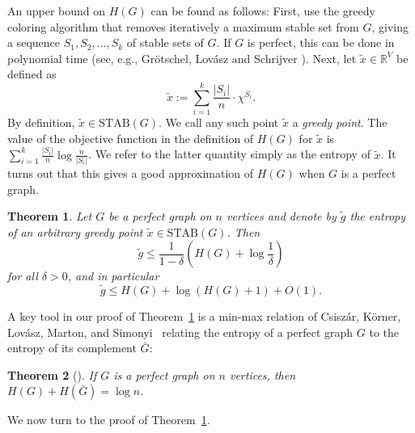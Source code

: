 \documentclass[12pt,oneside]{article}
\newtheorem{theorem}{Theorem}
\newcommand{\STAB}{\mathrm{STAB}}
\begin{document}
An upper bound on $H(G)$ can be found as follows: First, use the greedy coloring algorithm that removes iteratively a maximum stable set from $G$, giving a sequence $S_{1}, S_{2}, \dots, S_{k}$ of stable sets of $G$. If $G$ is perfect, this can be done in polynomial time (see, e.g., Gr\"otschel, Lov\'asz and Schrijver \cite{GLS93}). Next, let $\tilde x \in \mathbb{R}^V$ be defined as
$$
\tilde x := \sum_{i=1}^k \frac{|S_{i}|}{n} \cdot \chi^{S_{i}}.
$$
By definition, $\tilde x \in \STAB(G)$. We call any such point $\tilde{x}$ a {\em greedy point}. The value of the objective function in the definition of $H(G)$ for $\tilde x$ is $\sum_{i=1}^k \frac{|S_{i}|}{n} \log \frac{n}{|S_{i}|}$. We refer to the latter quantity simply as the entropy of $\tilde x$.
It turns out that this gives a good approximation of $H(G)$ when $G$ is a perfect graph.

\begin{theorem}
\label{th-greedy-perfect-graphs}
Let $G$ be a perfect graph on $n$ vertices and denote
by $\tilde{g}$ the entropy of an arbitrary greedy point $\tilde{x} \in \STAB(G)$. Then
$$
\tilde{g} \leq \frac{1}{1-\delta} \left(H(G) + \log \frac{1}{\delta} \right)
$$
for all $\delta > 0$, and in particular
$$
\tilde{g} \leq H(G) + \log (H(G)+1) + O(1).
$$
\end{theorem}

A key tool in our proof of Theorem~\ref{th-greedy-perfect-graphs} is a min-max relation of Csisz{\'a}r, K{\"o}rner, Lov{\'a}sz, Marton, and Simonyi~\cite{CKLMS90} relating the entropy of a perfect graph $G$ to the entropy of its complement $\bar G$:

\begin{theorem}[\hspace{-.01em}\cite{CKLMS90}]
\label{th-sum-log-n}
If $G$ is a perfect graph on $n$ vertices, then $H(G) + H(\bar G)=\log n$.
\end{theorem}

We now turn to the proof of Theorem~\ref{th-greedy-perfect-graphs}.
\end{document}
